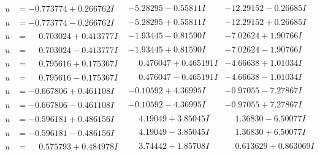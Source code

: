 \documentclass[1p]{elsarticle_modified}
\theoremstyle{definition}
\begin{document}
$$\begin{array}{c|c|c}
\begin{aligned}
u &= -0.773774 + 0.266762 I\end{aligned}
 & -5.28295 - 0.55811 I & -12.29152 - 0.26685 I \\ \hline\begin{aligned}
u &= -0.773774 - 0.266762 I\end{aligned}
 & -5.28295 + 0.55811 I & -12.29152 + 0.26685 I \\ \hline\begin{aligned}
u &= \phantom{-}0.703024 + 0.413777 I\end{aligned}
 & -1.93445 - 0.81590 I & -7.02624 + 1.90766 I \\ \hline\begin{aligned}
u &= \phantom{-}0.703024 - 0.413777 I\end{aligned}
 & -1.93445 + 0.81590 I & -7.02624 - 1.90766 I \\ \hline\begin{aligned}
u &= \phantom{-}0.795616 + 0.175367 I\end{aligned}
 & \phantom{-}0.476047 + 0.465191 I & -4.66638 + 1.01034 I \\ \hline\begin{aligned}
u &= \phantom{-}0.795616 - 0.175367 I\end{aligned}
 & \phantom{-}0.476047 - 0.465191 I & -4.66638 - 1.01034 I \\ \hline\begin{aligned}
u &= -0.667806 + 0.461108 I\end{aligned}
 & -0.10592 + 4.36995 I & -0.97055 - 7.27867 I \\ \hline\begin{aligned}
u &= -0.667806 - 0.461108 I\end{aligned}
 & -0.10592 - 4.36995 I & -0.97055 + 7.27867 I \\ \hline\begin{aligned}
u &= -0.596181 + 0.486156 I\end{aligned}
 & \phantom{-}4.19049 + 3.85045 I & \phantom{-}1.36830 - 6.50077 I \\ \hline\begin{aligned}
u &= -0.596181 - 0.486156 I\end{aligned}
 & \phantom{-}4.19049 - 3.85045 I & \phantom{-}1.36830 + 6.50077 I \\ \hline\begin{aligned}
u &= \phantom{-}0.575793 + 0.484978 I\end{aligned}
 & \phantom{-}3.74442 + 1.85708 I & \phantom{-}0.613629 + 0.863069 I \\ \hline\begin{aligned}

\end{aligned}
\end{array}$$
\end{document}
